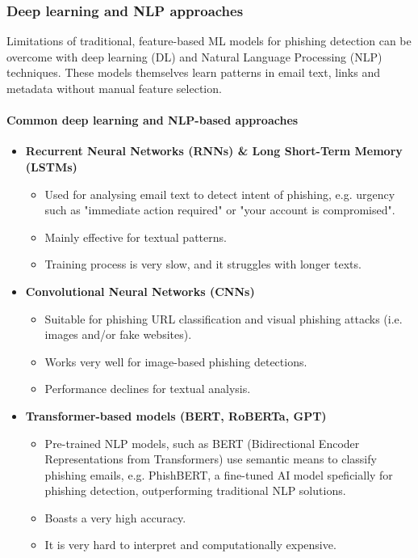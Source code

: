 \subsubsection*{Deep learning and NLP approaches}
Limitations of traditional, feature-based ML models for phishing detection can be overcome with deep learning (DL) and Natural Language Processing (NLP) techniques. These models themselves learn patterns in email text, links and metadata without manual feature selection.

\paragraph{Common deep learning and NLP-based approaches}
\begin{itemize}
    \item \textbf{Recurrent Neural Networks (RNNs) \& Long Short-Term Memory (LSTMs)}
    \begin{itemize}
        \item Used for analysing email text to detect intent of phishing, e.g. urgency such as "immediate action required" or "your account is compromised".
        \item Mainly effective for textual patterns.
        \item Training process is very slow, and it struggles with longer texts.
    \end{itemize}
    \item \textbf{Convolutional Neural Networks (CNNs)}
    \begin{itemize}
        \item Suitable for phishing URL classification and visual phishing attacks (i.e. images and/or fake websites).
        \item Works very well for image-based phishing detections.
        \item Performance declines for textual analysis.
    \end{itemize}
    \item \textbf{Transformer-based models (BERT, RoBERTa, GPT)}
    \begin{itemize}
        \item Pre-trained NLP models, such as BERT (Bidirectional Encoder Representations from Transformers) use semantic means to classify phishing emails, e.g. PhishBERT, a fine-tuned AI model speficially for phishing detection, outperforming traditional NLP solutions.
        \item Boasts a very high accuracy.
        \item It is very hard to interpret and computationally expensive.
    \end{itemize}
\end{itemize}

